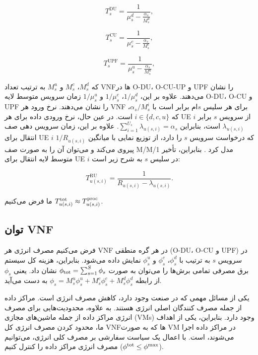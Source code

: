 \[T_{s}^{\text{DU}} = \frac{1}{\mu_s^d - \frac{\alpha_{s}}{M_s^{d}}},\]

\[T_{s}^{\text{CU}} = \frac{1}{\mu_s^c - \frac{\alpha_{s}}{M_s^{c}}},\]

\[T_{s}^{\text{UPF}} = \frac{1}{\mu_s^u - \frac{\alpha_{s}}{M_s^{u}}},\]

که $M_s^{d}$، $M_s^{c}$ و $M_s^{u}$ به ترتیب تعداد VNFها در O-DU، O-CU-UP و UPF را نشان می‌دهند.
علاوه بر این، $1/\mu_s^d$، $1/\mu_s^c$ و $1/\mu_s^u$ زمان سرویس متوسط لایه O-DU، O-CU و UPF را نشان می‌دهند. نرخ ورود هر VNF برای هر سلیس $s$ام برابر است با $\alpha_{s}/{M_s^{i}}$، که $i \in \{d,c,u\}$ است.
در عین حال، نرخ ورودی داده برای هر UE $i$ از سرویس $s$ برابر $\lambda_{u(s,i)}$ است، بنابراین $\sum_{i = 1}^{U_s} \lambda_{u(s,i)} = \alpha_s$.
علاوه بر این، زمان سرویس دهی صف انتقال برای UE $i$ که درخواست سرویس $s$ را دارد، از توزیع نمایی با میانگین $1/R_{u(s,i)}$ پیروی می‌کند و می‌توان آن را به صورت صف M/M/1 مدل کرد \cite{SystemCostMinimization,luong2018joint,luong2018novel}.
بنابراین، تأخیر متوسط لایه انتقال برای UE $i$ در سلیس $s$ به شرح زیر است:

\[ T_{u(s,i)}^{\text{RU}} = \frac{1}{R_{u(s,i)} - \lambda_{u(s,i)}}.\]

ما فرض می‌کنیم $T^{\text{\text{tot}}}_{u(s,i)} \approx T^{\text{proc}}_{u(s,i)} $.
\subsection{توان VNF}
فرض می‌کنیم مصرف انرژی هر VNF در هر گره منطقی (O-DU، O-CU و UPF) در سرویس $s$ به ترتیب با $\phi_{s}^d$، $\phi_{s}^c$ و $\phi_{s}^u$ نمایش داده می‌شود.
بنابراین، هزینه کل سیستم برق مصرفی تمامی برش‌ها را می‌توان به صورت $\phi_{\text{\text{tot}}} = \sum_{s=1}^{S}\phi_{s}$ نشان داد.
یعنی $\phi_{s}$ از رابطه $\phi_{s} = M_s^u \phi_s^u + M_s^c \phi_s^c+ M_s^d \phi_s^d$ به دست می‌آید.

یکی از مسائل مهمی که در صنعت وجود دارد، کاهش مصرف انرژی است. مراکز داده از جمله مصرف کنندگان اصلی انرژی هستند. به علاوه، محدودیت‌هایی برای مصرف انرژی مراکز داده از جمله ماشین‌های مجازی (VMs) وجود دارد. بنابراین، یکی از اهداف ما، محدود کردن مصرف انرژی کل VNF‌ها که به صورت VM در مراکز داده اجرا می‌شوند، است. با اعمال یک سیاست سفارشی بر مصرف کلی انرژی، می‌توانیم مصرف انرژی مراکز داده را کنترل کنیم ($\phi^{\text{\text{tot}}} \leq \phi^{\text{max}}$).
